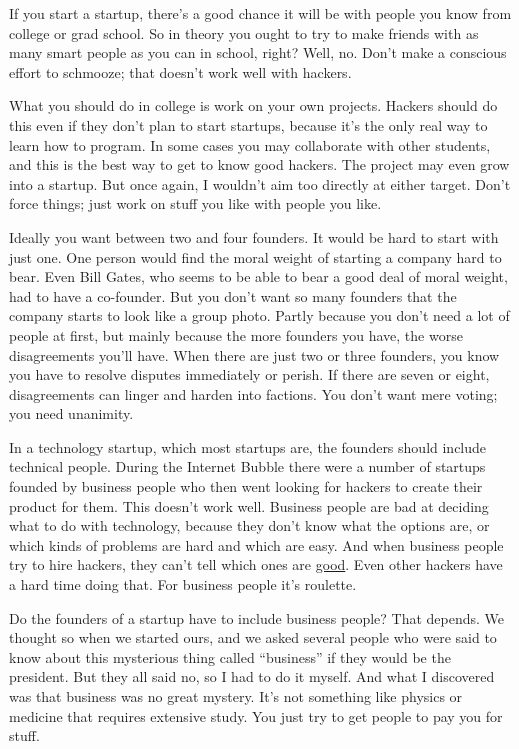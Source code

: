 \documentclass[12pt]{book}
\begin{document}
If you start a startup, there's a good chance it will be with people you
know from college or grad school. So in theory you ought to try to make
friends with as many smart people as you can in school, right? Well, no.
Don't make a conscious effort to schmooze; that doesn't work well with
hackers.

What you should do in college is work on your own projects. Hackers
should do this even if they don't plan to start startups, because it's
the only real way to learn how to program. In some cases you may
collaborate with other students, and this is the best way to get to know
good hackers. The project may even grow into a startup. But once again,
I wouldn't aim too directly at either target. Don't force things; just
work on stuff you like with people you like.

Ideally you want between two and four founders. It would be hard to
start with just one. One person would find the moral weight of starting
a company hard to bear. Even Bill Gates, who seems to be able to bear a
good deal of moral weight, had to have a co-founder. But you don't want
so many founders that the company starts to look like a group photo.
Partly because you don't need a lot of people at first, but mainly
because the more founders you have, the worse disagreements you'll have.
When there are just two or three founders, you know you have to resolve
disputes immediately or perish. If there are seven or eight,
disagreements can linger and harden into factions. You don't want mere
voting; you need unanimity.

In a technology startup, which most startups are, the founders should
include technical people. During the Internet Bubble there were a number
of startups founded by business people who then went looking for hackers
to create their product for them. This doesn't work well. Business
people are bad at deciding what to do with technology, because they
don't know what the options are, or which kinds of problems are hard and
which are easy. And when business people try to hire hackers, they can't
tell which ones are \href{gh.html}{good}. Even other hackers have a hard
time doing that. For business people it's roulette.

Do the founders of a startup have to include business people? That
depends. We thought so when we started ours, and we asked several people
who were said to know about this mysterious thing called ``business'' if
they would be the president. But they all said no, so I had to do it
myself. And what I discovered was that business was no great mystery.
It's not something like physics or medicine that requires extensive
study. You just try to get people to pay you for stuff.
\end{document}
